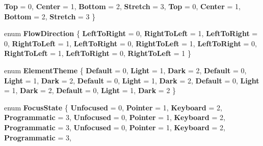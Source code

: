 \begin{DoxyCompactItemize}
\newline
{\bfseries Top} = 0, 
{\bfseries Center} = 1, 
{\bfseries Bottom} = 2, 
{\bfseries Stretch} = 3, 
\newline
{\bfseries Top} = 0, 
{\bfseries Center} = 1, 
{\bfseries Bottom} = 2, 
{\bfseries Stretch} = 3
 \}
\item 
\mbox{\label{namespace_windows_1_1_u_i_1_1_xaml_a05520a61af727955c4e50fc1f58fb7db}} 
enum {\bfseries Flow\+Direction} \{ \newline
{\bfseries Left\+To\+Right} = 0, 
{\bfseries Right\+To\+Left} = 1, 
{\bfseries Left\+To\+Right} = 0, 
{\bfseries Right\+To\+Left} = 1, 
\newline
{\bfseries Left\+To\+Right} = 0, 
{\bfseries Right\+To\+Left} = 1, 
{\bfseries Left\+To\+Right} = 0, 
{\bfseries Right\+To\+Left} = 1, 
\newline
{\bfseries Left\+To\+Right} = 0, 
{\bfseries Right\+To\+Left} = 1
 \}
\item 
\mbox{\label{namespace_windows_1_1_u_i_1_1_xaml_a7e1a4f3aaa641c44365e5b007c4d84ce}} 
enum {\bfseries Element\+Theme} \{ \newline
{\bfseries Default} = 0, 
{\bfseries Light} = 1, 
{\bfseries Dark} = 2, 
{\bfseries Default} = 0, 
\newline
{\bfseries Light} = 1, 
{\bfseries Dark} = 2, 
{\bfseries Default} = 0, 
{\bfseries Light} = 1, 
\newline
{\bfseries Dark} = 2, 
{\bfseries Default} = 0, 
{\bfseries Light} = 1, 
{\bfseries Dark} = 2, 
\newline
{\bfseries Default} = 0, 
{\bfseries Light} = 1, 
{\bfseries Dark} = 2
 \}
\item 
\mbox{\label{namespace_windows_1_1_u_i_1_1_xaml_a1ea241d4a0cb7c10af82c7b36d2806bc}} 
enum {\bfseries Focus\+State} \{ \newline
{\bfseries Unfocused} = 0, 
{\bfseries Pointer} = 1, 
{\bfseries Keyboard} = 2, 
{\bfseries Programmatic} = 3, 
\newline
{\bfseries Unfocused} = 0, 
{\bfseries Pointer} = 1, 
{\bfseries Keyboard} = 2, 
{\bfseries Programmatic} = 3, 
\newline
{\bfseries Unfocused} = 0, 
{\bfseries Pointer} = 1, 
{\bfseries Keyboard} = 2, 
{\bfseries Programmatic} = 3, 
\newline

\end{DoxyCompactItemize}
